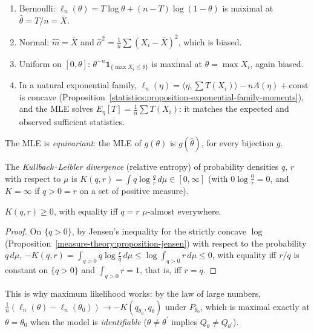 \begin{example}\label{statistics:example-mle}
\begin{enumerate}
\item Bernoulli: $\ell_n(\theta) = T\log\theta + (n - T)\log(1 - \theta)$ is maximal at $\hat\theta = T/n = \bar X$.
\item Normal: $\hat m = \bar X$ and $\hat\sigma^2 = \frac1n\sum(X_i - \bar X)^2$, which is biased.
\item Uniform on $[0, \theta]$: $\theta^{-n}\mathbf{1}_{\{\max X_i \leq \theta\}}$ is maximal at $\hat\theta = \max X_i$, again biased.
\item In a natural exponential family, $\ell_n(\eta) = \langle\eta, \sum T(X_i)\rangle - nA(\eta) + \text{const}$ is concave (Proposition~\ref{statistics:proposition-exponential-family-moments}), and the MLE solves
$E_\eta[T] = \frac1n\sum T(X_i)$: it matches the expected and observed sufficient statistics.
\end{enumerate}
The MLE is \emph{equivariant}: the MLE of $g(\theta)$ is $g(\hat\theta)$, for every bijection $g$.
\end{example}

\begin{definition}\label{statistics:definition-kullback-leibler}
The \emph{Kullback--Leibler divergence} (relative entropy) of probability densities $q$, $r$ with respect to $\mu$ is $K(q, r) = \int q\log\frac qr\,d\mu \in [0, \infty]$ (with $0\log\frac0r = 0$, and $K = \infty$ if $q > 0 = r$ on a set of positive measure).
\end{definition}

\begin{lemma}\label{statistics:lemma-gibbs}
$K(q, r) \geq 0$, with equality iff $q = r$ $\mu$-almost everywhere.
\end{lemma}

\begin{proof}
On $\{q > 0\}$, by Jensen's inequality for the strictly concave $\log$ (Proposition~\ref{measure-theory:proposition-jensen}) with respect to the probability $q\,d\mu$, $-K(q, r) = \int_{q > 0}q\log\frac rq\,d\mu \leq \log\int_{q > 0}r\,d\mu \leq 0$,
with equality iff $r/q$ is constant on $\{q > 0\}$ and $\int_{q > 0}r = 1$, that is, iff $r = q$.
\end{proof}

This is why maximum likelihood works: by the law of large numbers, $\frac1n(\ell_n(\theta) - \ell_n(\theta_0)) \to -K(q_{\theta_0}, q_\theta)$ under $P_{\theta_0}$, which is maximal exactly at $\theta = \theta_0$ when the model is
\emph{identifiable} ($\theta \neq \theta^{\prime}$ implies $Q_\theta \neq Q_{\theta^{\prime}}$).


